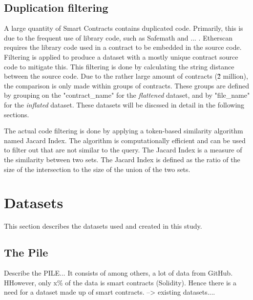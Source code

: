 \subsection{Duplication filtering}
\label{sec:duplication-filtering}
A large quantity of Smart Contracts contains duplicated code. Primarily, this is due to the frequent use of library code, such as Safemath and ... . Etherscan requires the library code used in a contract to be embedded in the source code. Filtering is applied to produce a dataset with a mostly unique contract source code to mitigate this. This filtering is done by calculating the string distance between the source code. Due to the rather large amount of contracts (\~2 million), the comparison is only made within groups of contracts. These groups are defined by grouping on the "contract\_name" for the \textit{flattened} dataset, and by "file\_name" for the \textit{inflated} dataset. These datasets will be discssed in detail in the following sections.

The actual code filtering is done by applying a token-based similarity algorithm named Jacard Index. The algorithm is computationally efficient and can be used to filter out  that are not similar to the query. The Jacard Index is a measure of the similarity between two sets. The Jacard Index is defined as the ratio of the size of the intersection to the size of the union of the two sets.


\section{Datasets}
This section describes the datasets used and created in this study.

\subsection{The Pile}
\label{sec:the-pile}
Describe the  PILE...  It consists of among others, a lot of data from GitHub. HHowever, only x\% of the data is smart contracts (Solidity). Hence there is a need for a dataset made up of smart contracts. --> existing datasets....

